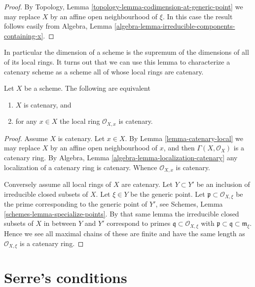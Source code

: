 \begin{proof}
By Topology, Lemma \ref{topology-lemma-codimension-at-generic-point}
we may replace $X$ by an affine open neighbourhood of $\xi$. In this
case the result follows easily from
Algebra, Lemma \ref{algebra-lemma-irreducible-components-containing-x}.
\end{proof}

\noindent
In particular the dimension of a scheme is the supremum of
the dimensions of all of its local rings. It turns out that
we can use this lemma to characterize a catenary scheme as a
scheme all of whose local rings are catenary.

\begin{lemma}
\label{lemma-catenary-local-rings-catenary}
Let $X$ be a scheme. The following are equivalent
\begin{enumerate}
\item $X$ is catenary, and
\item for any $x \in X$ the local ring $\mathcal{O}_{X, x}$ is
catenary.
\end{enumerate}
\end{lemma}

\begin{proof}
Assume $X$ is catenary. Let $x \in X$. By Lemma \ref{lemma-catenary-local}
we may replace $X$ by an affine open neighbourhood of $x$, and
then $\Gamma(X, \mathcal{O}_X)$ is a catenary ring. By
Algebra, Lemma \ref{algebra-lemma-localization-catenary} any
localization of a catenary ring is
catenary. Whence $\mathcal{O}_{X, x}$ is catenary.

\medskip\noindent
Conversely assume all local rings of $X$ are catenary.
Let $Y \subset Y'$ be an inclusion of irreducible closed
subsets of $X$. Let $\xi \in Y$ be the generic point.
Let $\mathfrak p \subset \mathcal{O}_{X, \xi}$ be the prime
corresponding to the generic point of $Y'$, see
Schemes, Lemma \ref{schemes-lemma-specialize-points}. By that same
lemma the irreducible closed subsets of $X$ in between $Y$ and $Y'$
correspond to primes $\mathfrak q \subset \mathcal{O}_{X, \xi}$
with $\mathfrak p \subset \mathfrak q \subset \mathfrak m_{\xi}$.
Hence we see all maximal chains of these are finite and have the
same length as $\mathcal{O}_{X, \xi}$ is a catenary ring.
\end{proof}






\section{Serre's conditions}
\label{section-Rk}

